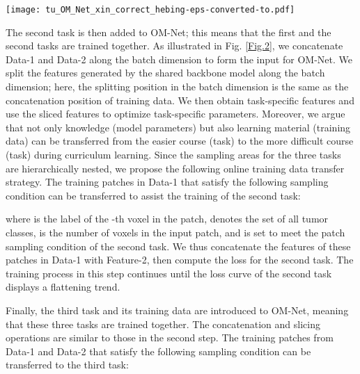 \documentclass[journal,twoside]{IEEEtran}
\begin{document}
\begin{figure*}
	\centering
	\texttt{[image: tu\_OM\_Net\_xin\_correct\_hebing-eps-converted-to.pdf]}  
	\caption{Network structure of OM-Net in the training stage. For the i-th task, its training data, feature maps, and outputs of the classification layer are denoted as Data-, Feature-, and Output-, respectively. The light blue rectangles marked with `Concat' and `Split' represent the concatenation and splitting operations, respectively, while the blue arrows represent the batch dimension.
		SoftmaxWithLoss is adopted as the loss function and applied to the output of each task. The shared backbone model refers to the network layers outlined by the yellow dashed line in Fig. \ref{Fig.1}. 
	}
	\label{Fig.2}
\end{figure*}



The second task is then added to OM-Net; this means that the first and the second tasks are trained together. As illustrated in Fig. \ref{Fig.2}, we concatenate Data-1 and Data-2 along the batch dimension to form the input for OM-Net. We split the features generated by the shared backbone model along the batch dimension; here, the splitting position in the batch dimension is the same as the concatenation position of training data. We then obtain task-specific features and use the sliced features to optimize  task-specific parameters. Moreover, we argue that not only knowledge (model parameters) but also learning material (training data) can be transferred from the easier course (task) to the more difficult course (task) during curriculum learning. Since the sampling areas for the three tasks are hierarchically nested, we propose the following online training data transfer strategy. The training patches in Data-1 that satisfy the following sampling condition can be transferred to assist the training of the second task:
    
where  is the label of the -th voxel in the patch,  denotes the set of all tumor classes,  is the number of voxels in the input patch, and  is set to meet the patch sampling condition of the second task. We thus concatenate the features of these patches in Data-1 with Feature-2, then compute the loss for the second task. The training process in this step continues until the loss curve of the second task displays a flattening trend.







Finally, the third task and its training data are introduced to OM-Net, meaning that these three tasks are trained together. The concatenation and slicing operations are similar to those in the second step. The training patches from Data-1 and Data-2 that satisfy the following sampling condition can be transferred to the third task:
   
\end{document}

